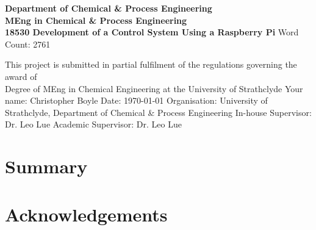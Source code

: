 \documentclass[a4]{report}
\def\atitle{Development of a Control System Using a Raspberry Pi}
\def\thewords{2761}
\begin{document}
	\begin{titlepage}
		\centering
		\vskip4cm
		{
			\bfseries\Large
			Department of Chemical \& Process Engineering\\
			\vskip1cm
			MEng in Chemical \& Process Engineering\\
			18530
			\vskip3cm
			\LARGE\atitle
		}
		\vskip3cm
		{\small Word Count: \thewords}
		\vskip1cm
		\begin{flushleft}
			This project is submitted in partial fulfilment of the regulations governing the award of \\
			Degree of MEng in Chemical Engineering at the University of Strathclyde
			\vskip2cm
			Your name: Christopher Boyle \hfill Date: \today
			\vskip1cm
			Organisation: University of Strathclyde, Department of Chemical \& Process Engineering\newline%
			In-house Supervisor: Dr. Leo Lue \newline%
			Academic Supervisor: Dr. Leo Lue
		\end{flushleft}
	\end{titlepage}

	
	\chapter*{Summary}
	
	\tableofcontents
	
	\chapter*{Acknowledgements}
	
\end{document}
